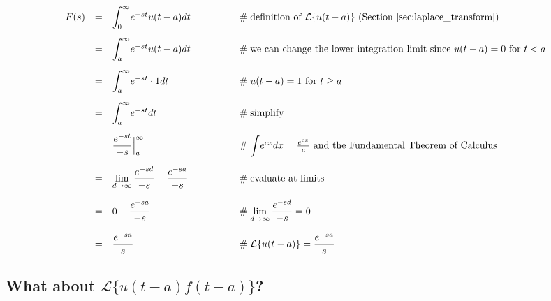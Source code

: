 \documentclass{article}
\theoremstyle{definition}
\begin{document}
\bigskip
\begin{equation*}
\begin{array}{lllll}
F(s)                                                                                                                          
&=& \mathlarger{\int}^\infty_0 e^{-st} u(t-a) dt                        &\qquad\qquad \mathrel{\#} \text{definition of $\mathcal{L}\{u(t-a)\}$ (Section \ref{sec:laplace_transform})}                          \\
[15pt]
&=& \mathlarger{\int}^\infty_a e^{-st} u(t-a) dt                        &\qquad\qquad \mathrel{\#} \text{we can change the lower integration limit since $u(t-a) = 0$ for $t < a$}                             \\
[15pt]
&=& \mathlarger{\int}^\infty_a e^{-st} \cdot 1 dt                      &\qquad\qquad \mathrel{\#} \text{$u(t-a) = 1$ for $t \geq a$}                                                                                                    \\
[15pt]
&=& \mathlarger{\int}^\infty_a e^{-st} dt                                  &\qquad\qquad \mathrel{\#} \text{simplify}                                                                                                                                 \\
[15pt]
&=& \mathlarger{\frac{e^{-st}}{-s}} \Big |^\infty_a                    &\qquad\qquad \mathrel{\#} \mathlarger{\int} e^{cx} dx = \frac{e^{cx}}{c} \text{ and the Fundamental Theorem of Calculus}  \\
[15pt]
&=& \lim\limits_{d \to \infty} \mathlarger{\frac{e^{-sd}}{-s}} - \mathlarger{\frac{e^{-sa}}{-s}}   &\qquad\qquad \mathrel{\#} \text{evaluate at limits}                                                                  \\
[15pt]
&=& 0 -  \mathlarger{\frac{e^{-sa}}{-s}}                                   &\qquad\qquad \mathrel{\#} \lim\limits_{d \to \infty} \mathlarger{\frac{e^{-sd}}{-s}} = 0                                                             \\
[15pt]
&=& \mathlarger{\frac{e^{-sa}}{s}}                                          &\qquad\qquad \mathrel{\#} \mathcal{L}\{u(t-a)\} = \mathlarger{\frac{e^{-sa}}{s}}
\end{array}
\end{equation*}


\subsection{What about $\mathcal{L}\{u(t-a) f(t-a)\}$?}
\label{sec:lt_uf}
\end{document}
